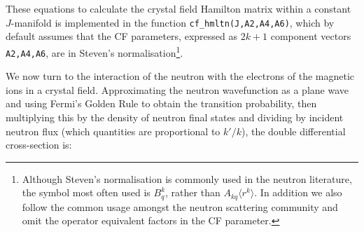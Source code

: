 \documentclass[12pt,onecolumn,tightenlines,aps,amsmath,floatfix,notitlepage,nofootinbib]{revtex4}
\newcommand{\bra}[1]{\langle #1|}
\newcommand{\ket}[1]{|#1\rangle}
\begin{document}


%
%
%


These equations to calculate the crystal field Hamilton matrix within a constant $J$-manifold is implemented in the function \texttt{cf\_hmltn(J,A2,A4,A6)}, which by default assumes that the CF parameters, expressed as $2k+1$ component vectors \texttt{A2,A4,A6}, are in Steven's normalisation\footnote{Although Steven's normalisation is commonly used in the neutron literature, the symbol most often used is $B_q^k$, rather than $A_{kq}\langle r^k \rangle$. In addition we also follow the common usage amongst the neutron scattering community and omit the operator equivalent factors in the CF parameter.}.

We now turn to the interaction of the neutron with the electrons of the magnetic ions in a crystal field. Approximating the neutron wavefunction as a plane wave and using Fermi's Golden Rule to obtain the transition probability, then multiplying this by the density of neutron final states and dividing by incident neutron flux (which quantities are proportional to $k'/k$), the double differential cross-section is:
\end{document}
